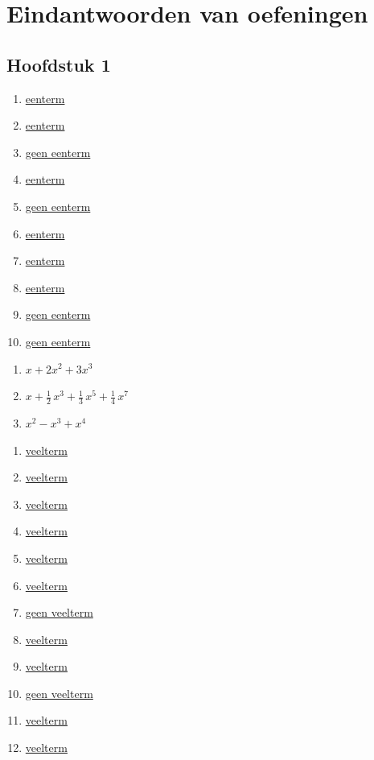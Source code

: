 \documentclass{ximera}
\begin{document}
	\author{Koen De Naeghel}
	\label{xim:veeltermen_eindantwoorden}
\chapter{Eindantwoorden van oefeningen}
\section*{Hoofdstuk 1}

\begin{Antwoord} \label{antw1.1}
\begin{enumerate}

\item
\hyperlink{oef1.1}{eenterm}
\item
\hyperlink{oef1.1}{eenterm}
\item
\hyperlink{oef1.1}{geen eenterm}
\item
\hyperlink{oef1.1}{eenterm}
\item
\hyperlink{oef1.1}{geen eenterm}
\item
\hyperlink{oef1.1}{eenterm}
\item\hyperlink{oef1.1}{eenterm}
\item
\hyperlink{oef1.1}{eenterm}
\item
\hyperlink{oef1.1}{geen eenterm}
\item
\hyperlink{oef1.1}{geen eenterm}
\end{enumerate}
\end{Antwoord}

\begin{Antwoord} \label{antw1.2}
\begin{enumerate}
\item
\hyperlink{oef1.2}{$x + 2x^2 + 3x^3$}
\item
\hyperlink{oef1.2}{$x + \frac{1}{2}\,x^3 + \frac{1}{3}\,x^5 + \frac{1}{4}\,x^7$}
\item
\hyperlink{oef1.2}{$x^2 - x^3 + x^4$}
\end{enumerate}
\end{Antwoord}

\begin{Antwoord} \label{antw1.3}
\begin{enumerate}
\item
\hyperlink{oef1.3}{veelterm}
\item
\hyperlink{oef1.3}{veelterm}
\item
\hyperlink{oef1.3}{veelterm}
\item
\hyperlink{oef1.3}{veelterm}
\item
\hyperlink{oef1.3}{veelterm}
\item
\hyperlink{oef1.3}{veelterm}
\item
\hyperlink{oef1.3}{geen veelterm}
\item
\hyperlink{oef1.3}{veelterm}
\item
\hyperlink{oef1.3}{veelterm}
\item
\hyperlink{oef1.3}{geen veelterm}
\item
\hyperlink{oef1.3}{veelterm}
\item
\hyperlink{oef1.3}{veelterm}
\end{enumerate}
\setcounter{enumi}{4}
\end{Antwoord}
\end{document}
